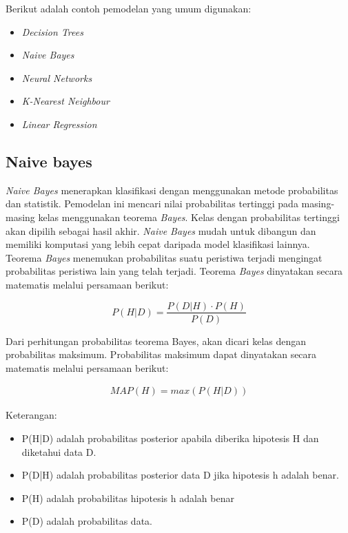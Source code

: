 \noindent Berikut adalah contoh pemodelan yang umum digunakan:
\begin{itemize}
\item \textit{Decision Trees}
\item \textit{Naive Bayes}
\item \textit{Neural Networks}
\item \textit{K-Nearest Neighbour}
\item \textit{Linear Regression}
\end{itemize}

\newpage
\subsection{Naive bayes}
\label{sec:naive_bayes}
\par \textit{Naive Bayes} menerapkan klasifikasi dengan menggunakan metode probabilitas dan statistik. Pemodelan ini mencari nilai probabilitas tertinggi pada masing-masing kelas menggunakan teorema \textit{Bayes}. Kelas dengan probabilitas tertinggi akan dipilih sebagai hasil akhir. \textit{Naive Bayes} mudah untuk dibangun dan memiliki komputasi yang lebih cepat daripada model klasifikasi lainnya.\\

\noindent Teorema \textit{Bayes} menemukan probabilitas suatu peristiwa terjadi mengingat probabilitas peristiwa lain yang telah terjadi. Teorema \textit{Bayes} dinyatakan secara matematis melalui persamaan berikut:

\begin{equation}
P(H|D) = \frac{P(D|H) \cdot P(H)}{P(D)}
\end{equation}

\noindent
Dari perhitungan probabilitas teorema Bayes, akan dicari kelas dengan probabilitas maksimum. Probabilitas maksimum dapat dinyatakan secara matematis melalui persamaan berikut:

\begin{align}
MAP(H) = max(P(H|D))
\end{align}

\noindent Keterangan:
\begin{itemize}
\item P(H|D) adalah probabilitas posterior apabila diberika hipotesis H dan diketahui data D. 
\item P(D|H) adalah probabilitas posterior data D jika hipotesis h adalah benar.
\item P(H) adalah probabilitas hipotesis h adalah benar 
\item P(D) adalah probabilitas data.
\end{itemize}

